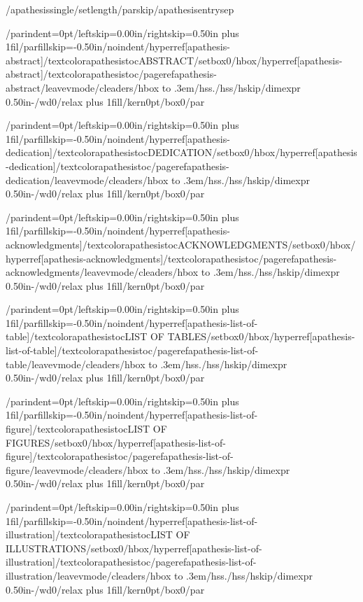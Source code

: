 {/apathesissingle/setlength{/parskip}{/apathesisentrysep}

{/parindent=0pt/leftskip=0.00in/rightskip=0.50in plus 1fil/parfillskip=-0.50in/noindent/hyperref[apathesis-abstract]{/textcolor{apathesistoc}{ABSTRACT}}/setbox0/hbox{/hyperref[apathesis-abstract]{/textcolor{apathesistoc}{/pageref{apathesis-abstract}}}}/leavevmode/cleaders/hbox to .3em{/hss./hss}/hskip/dimexpr 0.50in-/wd0/relax plus 1fill/kern0pt/box0/par}

{/parindent=0pt/leftskip=0.00in/rightskip=0.50in plus 1fil/parfillskip=-0.50in/noindent/hyperref[apathesis-dedication]{/textcolor{apathesistoc}{DEDICATION}}/setbox0/hbox{/hyperref[apathesis-dedication]{/textcolor{apathesistoc}{/pageref{apathesis-dedication}}}}/leavevmode/cleaders/hbox to .3em{/hss./hss}/hskip/dimexpr 0.50in-/wd0/relax plus 1fill/kern0pt/box0/par}

{/parindent=0pt/leftskip=0.00in/rightskip=0.50in plus 1fil/parfillskip=-0.50in/noindent/hyperref[apathesis-acknowledgments]{/textcolor{apathesistoc}{ACKNOWLEDGMENTS}}/setbox0/hbox{/hyperref[apathesis-acknowledgments]{/textcolor{apathesistoc}{/pageref{apathesis-acknowledgments}}}}/leavevmode/cleaders/hbox to .3em{/hss./hss}/hskip/dimexpr 0.50in-/wd0/relax plus 1fill/kern0pt/box0/par}

{/parindent=0pt/leftskip=0.00in/rightskip=0.50in plus 1fil/parfillskip=-0.50in/noindent/hyperref[apathesis-list-of-table]{/textcolor{apathesistoc}{LIST OF TABLES}}/setbox0/hbox{/hyperref[apathesis-list-of-table]{/textcolor{apathesistoc}{/pageref{apathesis-list-of-table}}}}/leavevmode/cleaders/hbox to .3em{/hss./hss}/hskip/dimexpr 0.50in-/wd0/relax plus 1fill/kern0pt/box0/par}

{/parindent=0pt/leftskip=0.00in/rightskip=0.50in plus 1fil/parfillskip=-0.50in/noindent/hyperref[apathesis-list-of-figure]{/textcolor{apathesistoc}{LIST OF FIGURES}}/setbox0/hbox{/hyperref[apathesis-list-of-figure]{/textcolor{apathesistoc}{/pageref{apathesis-list-of-figure}}}}/leavevmode/cleaders/hbox to .3em{/hss./hss}/hskip/dimexpr 0.50in-/wd0/relax plus 1fill/kern0pt/box0/par}

{/parindent=0pt/leftskip=0.00in/rightskip=0.50in plus 1fil/parfillskip=-0.50in/noindent/hyperref[apathesis-list-of-illustration]{/textcolor{apathesistoc}{LIST OF ILLUSTRATIONS}}/setbox0/hbox{/hyperref[apathesis-list-of-illustration]{/textcolor{apathesistoc}{/pageref{apathesis-list-of-illustration}}}}/leavevmode/cleaders/hbox to .3em{/hss./hss}/hskip/dimexpr 0.50in-/wd0/relax plus 1fill/kern0pt/box0/par}

}

